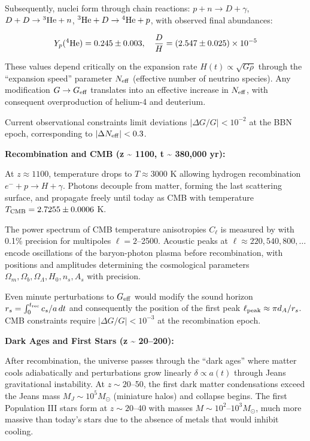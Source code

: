 \documentclass[10pt,a4paper]{article}
\begin{document}
Subsequently, nuclei form through chain reactions:
\(p + n \to D + \gamma\), \(D + D \to {}^3{\rm He} + n\),
\({}^3{\rm He} + D \to {}^4{\rm He} + p\), with observed final
abundances:

\[Y_p({}^4{\rm He}) = 0.245 \pm 0.003, \quad \frac{D}{H} = (2.547 \pm 0.025) \times 10^{-5}\]

These values depend critically on the expansion rate
\(H(t) \propto \sqrt{G \rho}\) through the ``expansion speed'' parameter
\(N_{\rm eff}\) (effective number of neutrino species). Any modification
\(G \to G_{\rm eff}\) translates into an effective increase in
\(N_{\rm eff}\), with consequent overproduction of helium-4 and
deuterium.

Current observational constraints limit deviations
\(|\Delta G/G| < 10^{-2}\) at the BBN epoch, corresponding to
\(|\Delta N_{\rm eff}| < 0.3\).

\textbf{Recombination and CMB (z \textasciitilde{} 1100, t
\textasciitilde{} 380,000 yr):}

At \(z \approx 1100\), temperature drops to \(T \approx 3000\) K
allowing hydrogen recombination \(e^- + p \to H + \gamma\). Photons
decouple from matter, forming the last scattering surface, and propagate
freely until today as CMB with temperature
\(T_{\rm CMB} = 2.7255 \pm 0.0006\) K.

The power spectrum of CMB temperature anisotropies \(C_\ell\) is
measured by \cite{PlanckCollaboration2020a} with 0.1\% precision for multipoles
\(\ell = 2\)--2500. Acoustic peaks at
\(\ell \approx 220, 540, 800, \ldots\) encode oscillations of the
baryon-photon plasma before recombination, with positions and amplitudes
determining the cosmological parameters
\(\Omega_m, \Omega_b, \Omega_\Lambda, H_0, n_s, A_s\) with precision.

Even minute perturbations to \(G_{\rm eff}\) would modify the sound
horizon \(r_s = \int_0^{t_{\rm rec}} c_s/a\, dt\) and consequently the
position of the first peak \(\ell_{\rm peak} \approx \pi d_A/r_s\). CMB
constraints require \(|\Delta G/G| < 10^{-3}\) at the recombination
epoch.

\textbf{Dark Ages and First Stars (z \textasciitilde{} 20--200):}

After recombination, the universe passes through the ``dark ages'' where
matter cools adiabatically and perturbations grow linearly
\(\delta \propto a(t)\) through Jeans gravitational instability. At
\(z \sim 20\)--50, the first dark matter condensations exceed the Jeans
mass \(M_J \sim 10^5 M_\odot\) (miniature halos) and collapse begins.
The first Population III stars form at \(z \sim 20\)--40 with masses
\(M \sim 10^2\)--\(10^3 M_\odot\), much more massive than today's stars
due to the absence of metals that would inhibit cooling.
\end{document}

